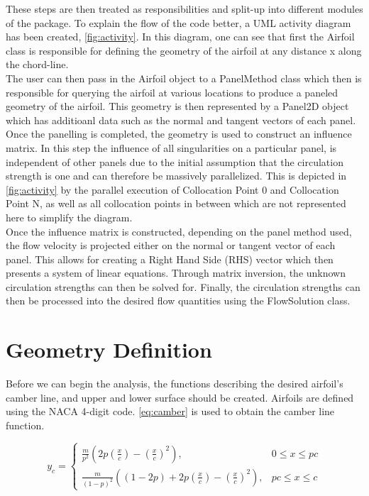 These steps are then treated as responsibilities and split-up into different
modules of the \numfoil package. To explain the flow of the code better, a UML
activity diagram has been created, \cref{fig:activity}. In this diagram, one
can see that first the \textsf{Airfoil} class is responsible for defining the
geometry of the airfoil at any distance x along the chord-line. \\

The user can then pass in the \textsf{Airfoil} object to a \textsf{PanelMethod}
class which then is responsible for querying the airfoil at various locations
to produce a paneled geometry of the airfoil. This geometry is then represented
by a \textsf{Panel2D} object which has additioanl data such as the normal and
tangent vectors of each panel. Once the panelling is completed, the geometry is
used to construct an influence matrix. In this step the influence of all
singularities on a particular panel, is independent of other panels due to the
initial assumption that the circulation strength is one and can therefore be
massively parallelized. This is depicted in \cref{fig:activity} by the parallel
execution of Collocation Point 0 and Collocation Point N, as well as all
collocation points in between which are not represented here to simplify the
diagram.\\

Once the influence matrix is constructed, depending on the panel method used,
the flow velocity is projected either on the normal or tangent vector of each
panel. This allows for creating a Right Hand Side (RHS) vector which then
presents a system of linear equations. Through matrix inversion, the unknown
circulation strengths can then be solved for. Finally, the circulation
strengths can then be processed into the desired flow quantities using the
\textsf{FlowSolution} class.

\section{Geometry Definition}
Before we can begin the analysis, the functions describing the desired
airfoil's camber line, and upper and lower surface should be created. Airfoils
are defined using the NACA 4-digit code. \autoref{eq:camber} is used to obtain
the camber line function.

\begin{equation}
\label{eq:camber}
    y_{c}=\left\{
        \begin{array}{ll}
            \frac{m}{p^{2}}\left(2 p\left(\frac{x}{c}\right)-\left(\frac{x}{c}\right)^{2}\right),
            & 0 \leq x \leq p c \\
            \frac{m}{(1-p)^{2}}\left((1-2 p)+2 p\left(\frac{x}{c}\right)-\left(\frac{x}{c}\right)^{2}\right),
            & p c \leq x \leq c
        \end{array}\right.
\end{equation}
\medskip

